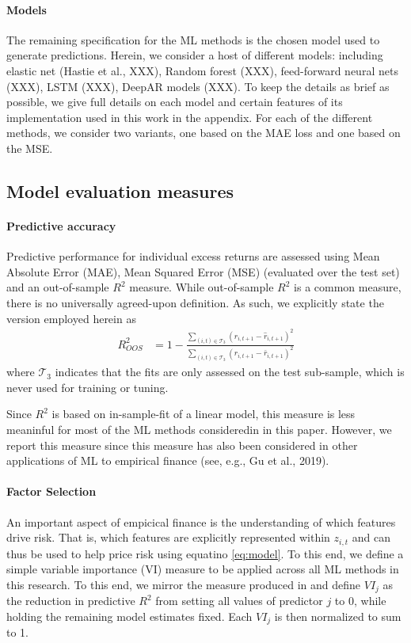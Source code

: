 \documentclass{article}
\begin{document}
\paragraph{Models} The remaining specification for the ML methods is the chosen model used to generate predictions. Herein, we consider a host of different models: including elastic net (Hastie et al., XXX), Random forest (XXX), feed-forward neural nets (XXX), LSTM (XXX), DeepAR models (XXX). To keep the details as brief as possible, we give full details on each model and certain features of its implementation used in this work in the appendix. For each of the different methods, we consider two variants, one based on the MAE loss and one based on the MSE. 

\subsection{Model evaluation measures}
\paragraph{Predictive accuracy}

Predictive performance for individual excess returns are assessed using Mean Absolute Error (MAE), Mean Squared Error (MSE) (evaluated over the test set) and an out-of-sample $R^2$ measure. While  out-of-sample $R^2$ is a common measure, there is no universally agreed-upon definition. As such, we explicitly state the version employed herein as
\begin{align}
R^2_{OOS} &= 1 - \frac{\sum_{(i, t)\in\mathcal{T}_3}(r_{i, t+1} - \widehat{r}_{i, t+1})^2}
{\sum_{(i, t)\in\mathcal{T}_3} \left( r_{i, t+1} - \bar{r}_{i, t+1} \right) ^2}
\end{align}
where $\mathcal{T}_3$ indicates that the fits are only assessed on the test sub-sample, which is never used for training or tuning.

Since $R^2$ is based on in-sample-fit of a linear model, this measure is less meaninful for most of the ML methods consideredin in this paper. However, we report this measure since this measure has also been considered in other applications of ML to empirical finance (see, e.g., Gu et al., 2019). 
\paragraph{Factor Selection}

An important aspect of empicical finance is the understanding of which features drive risk. That is, which features are explicitly represented within $z_{i,t}$ and can thus be used to help price risk using equatino \ref{eq:model}. To this end, we define a simple variable importance (VI) measure to be applied across all ML methods in this research. To this end, we mirror the measure produced in \cite{gu_empirical_2018} and define $VI_j$ as the reduction in predictive $R^2$ from setting all values of predictor $j$ to 0, while holding the remaining model estimates fixed. Each $VI_j$ is then normalized to sum to 1. 
\end{document}
